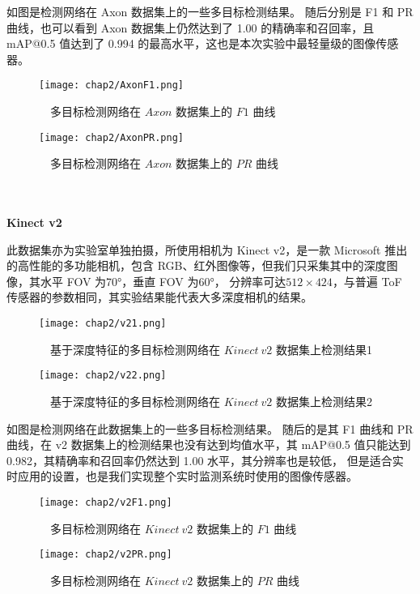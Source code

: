 如图是检测网络在 Axon 数据集上的一些多目标检测结果。
随后分别是 F1 和 PR 曲线，也可以看到 Axon 数据集上仍然达到了 1.00 的精确率和召回率，且 mAP@0.5 值达到了 0.994 的最高水平，这也是本次实验中最轻量级的图像传感器。
\begin{figure}[htbp]
	\begin{minipage}{0.48\linewidth}
		\centering
		\texttt{[image: chap2/AxonF1.png]}
		\caption{\ \ 多目标检测网络在 $Axon$ 数据集上的 $F1$ 曲线}
		\label{fig2-16}%
	\end{minipage}
	\begin{minipage}{0.48\linewidth}
		\centering
		\texttt{[image: chap2/AxonPR.png]}
		\caption{\ \ 多目标检测网络在 $Axon$ 数据集上的 $PR$ 曲线}
		\label{fig2-17}%
	\end{minipage}
\end{figure}

\\ \hspace*{\fill} \\
\textbf{Kinect v2}

此数据集亦为实验室单独拍摄，所使用相机为 Kinect v2，是一款 Microsoft 推出的高性能的多功能相机，包含 RGB、红外图像等，但我们只采集其中的深度图像，其水平 FOV 为70°，垂直 FOV 为60°，
分辨率可达$512\times 424$，与普遍 ToF 传感器的参数相同，其实验结果能代表大多深度相机的结果。
\begin{figure}[htbp]
	\centering
	\begin{minipage}{0.48\linewidth}
		\centering
		\texttt{[image: chap2/v21.png]}
		\caption{\ \ 基于深度特征的多目标检测网络在 $Kinect\ v2$ 数据集上检测结果1}
		\label{fig2-18}%
	\end{minipage}
	\begin{minipage}{0.48\linewidth}
		\centering
		\texttt{[image: chap2/v22.png]}
		\caption{\ \ 基于深度特征的多目标检测网络在 $Kinect\ v2$ 数据集上检测结果2}
		\label{fig2-19}%
	\end{minipage}
\end{figure}

如图是检测网络在此数据集上的一些多目标检测结果。
随后的是其 F1 曲线和 PR 曲线，在 v2 数据集上的检测结果也没有达到均值水平，其 mAP@0.5 值只能达到 0.982，其精确率和召回率仍然达到 1.00 水平，其分辨率也是较低，
但是适合实时应用的设置，也是我们实现整个实时监测系统时使用的图像传感器。
\begin{figure}[htbp]
	\begin{minipage}{0.48\linewidth}
		\centering
		\texttt{[image: chap2/v2F1.png]}
		\caption{\ \ 多目标检测网络在 $Kinect\ v2$ 数据集上的 $F1$ 曲线}
		\label{fig2-20}%
	\end{minipage}
	\begin{minipage}{0.48\linewidth}
		\centering
		\texttt{[image: chap2/v2PR.png]}
		\caption{\ \ 多目标检测网络在 $Kinect\ v2$ 数据集上的 $PR$ 曲线}
		\label{fig2-21}%
	\end{minipage}
\end{figure}

